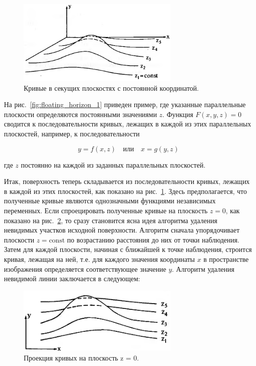 \begin{figure}[H]
    \centering
    \includegraphics[width=0.7\textwidth]{img/floating_horizon_2.png}
    \caption{Кривые в секущих плоскостях с постоянной координатой.}
    \label{fig:floating_horizon_2}
\end{figure}

На рис.~\ref{fig:floating_horizon_1} приведен пример, где указанные параллельные плоскости определяются постоянными значениями \( z \). Функция \( F(x, y, z) = 0 \) сводится к последовательности кривых, лежащих в каждой из этих параллельных плоскостей, например, к последовательности

\[
y = f(x, z) \quad \text{или} \quad x = g(y, z)
\]

где \( z \) постоянно на каждой из заданных параллельных плоскостей.

Итак, поверхность теперь складывается из последовательности кривых, лежащих в каждой из этих плоскостей, как показано на рис.~\ref{fig:floating_horizon_2}. Здесь предполагается, что полученные кривые являются однозначными функциями независимых переменных. Если спроецировать полученные кривые на плоскость \( z = 0 \), как показано на рис.~\ref{fig:floating_horizon_3}, то сразу становится ясна идея алгоритма удаления невидимых участков исходной поверхности. Алгоритм сначала упорядочивает плоскости \( z = \text{const} \) по возрастанию расстояния до них от точки наблюдения. Затем для каждой плоскости, начиная с ближайшей к точке наблюдения, строится кривая, лежащая на ней, т.е. для каждого значения координаты \( x \) в пространстве изображения определяется соответствующее значение \( y \). Алгоритм удаления невидимой линии заключается в следующем:

\begin{figure}[H]
    \centering
    \includegraphics[width=0.7\textwidth]{img/floating_horizon_3.png}
    \caption{Проекция кривых на плоскость z = 0.}
    \label{fig:floating_horizon_3}
\end{figure}

